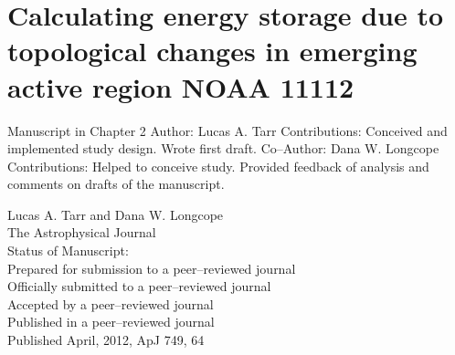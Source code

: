 \chapter{Calculating energy storage due to topological changes in emerging active region NOAA 11112}\label{ch:ar11112}
\begin{manuscriptauths}
  Manuscript in Chapter 2
  \newline
  \newline
  Author: Lucas A. Tarr
  \newline
  \newline
  Contributions: Conceived and implemented study design.  Wrote first draft.
  \newline
  \newline
  Co--Author: Dana W. Longcope
  \newline
  \newline
  Contributions: Helped to conceive study.  Provided feedback of analysis and comments on drafts of the manuscript.
\end{manuscriptauths}
\pagebreak
  
\begin{manuscriptinfo}
  \noindent Lucas A. Tarr and Dana W. Longcope\\
  The Astrophysical Journal\\
  Status of Manuscript:\\
  \uline{\phantom{5eM}}Prepared for submission to a peer--reviewed journal\\
  \uline{\phantom{5eM}}Officially submitted to a peer--reviewed journal\\
  \uline{\phantom{5eM}}Accepted by a peer--reviewed journal\\
  \uline{\phantom{5eM}}Published in a peer--reviewed journal\\
  \newline
  \newline
  Published April, 2012, ApJ 749, 64
\end{manuscriptinfo}

